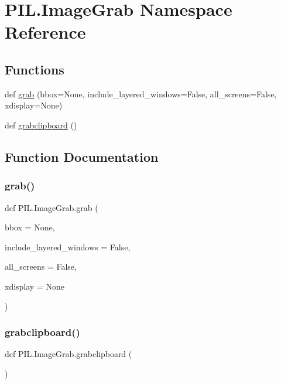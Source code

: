 \hypertarget{namespacePIL_1_1ImageGrab}{}\section{P\+I\+L.\+Image\+Grab Namespace Reference}
\label{namespacePIL_1_1ImageGrab}
\subsection*{Functions}
\begin{DoxyCompactItemize}
\item 
def \hyperlink{namespacePIL_1_1ImageGrab_a6d36f9b57ec4a14169350c7775a80919}{grab} (bbox=None, include\+\_\+layered\+\_\+windows=False, all\+\_\+screens=False, xdisplay=None)
\item 
def \hyperlink{namespacePIL_1_1ImageGrab_af06f8c56acb44ef8a995b15e565eb8a7}{grabclipboard} ()
\end{DoxyCompactItemize}


\subsection{Function Documentation}
\mbox{\label{namespacePIL_1_1ImageGrab_a6d36f9b57ec4a14169350c7775a80919}} 
\subsubsection{\texorpdfstring{grab()}{grab()}}
{\footnotesize\ttfamily def P\+I\+L.\+Image\+Grab.\+grab (\begin{DoxyParamCaption}\item[{}]{bbox = {\ttfamily None},  }\item[{}]{include\+\_\+layered\+\_\+windows = {\ttfamily False},  }\item[{}]{all\+\_\+screens = {\ttfamily False},  }\item[{}]{xdisplay = {\ttfamily None} }\end{DoxyParamCaption})}

\mbox{\label{namespacePIL_1_1ImageGrab_af06f8c56acb44ef8a995b15e565eb8a7}} 
\subsubsection{\texorpdfstring{grabclipboard()}{grabclipboard()}}
{\footnotesize\ttfamily def P\+I\+L.\+Image\+Grab.\+grabclipboard (\begin{DoxyParamCaption}{ }\end{DoxyParamCaption})}

